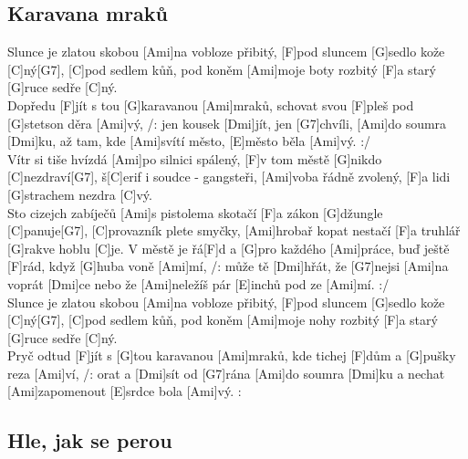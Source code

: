 \documentclass[10pt]{article}
\begin{document}
\begin{Large}
\begin{minipage}{\textwidth}
\subsection{Karavana mraků}
\begin{multicols}{2}
\begin{guitar}
	[C]Slunce je zlatou skobou [Ami]na vobloze přibitý,
	[F]pod sluncem [G]sedlo kože [C]ný[G7],
	[C]pod sedlem kůň, 
	pod koněm [Ami]moje boty rozbitý
	[F]a starý [G]ruce sedře [C]ný.
	\\
	[C7]Dopředu [F]jít s tou [G]karavanou [Ami]mraků,
	schovat svou [F]pleš pod [G]stetson děra [Ami]vý,
	/: jen kousek [Dmi]jít, jen [G7]chvíli, [Ami]do soumra [Dmi]ku,
	až tam, kde [Ami]svítí město, [E]město běla [Ami]vý. :/
	\\
	[C]Vítr si tiše hvízdá [Ami]po silnici spálený,
	[F]v tom městě [G]nikdo [C]nezdraví[G7], 
	š[C]erif i soudce - gangsteři, 
	[Ami]voba řádně zvolený,
	[F]a lidi [G]strachem nezdra [C]vý.
	\\
	[C]Sto cizejch zabíječů [Ami]s pistolema skotačí
	[F]a zákon [G]džungle [C]panuje[G7], 
	[C]provazník plete smyčky, 
	[Ami]hrobař kopat nestačí
	[F]a truhlář [G]rakve hoblu [C]je.
	\columnbreak
	[C7]V městě je řá[F]d a [G]pro každého [Ami]práce,
	buď ještě [F]rád, když [G]huba voně [Ami]mí,
	/: může tě [Dmi]hřát, že [G7]nejsi [Ami]na voprát [Dmi]ce
	nebo že [Ami]neležíš pár [E]inchů pod ze [Ami]mí. :/
	\\
	[C]Slunce je zlatou skobou [Ami]na vobloze přibitý,
	[F]pod sluncem [G]sedlo kože [C]ný[G7], 
	[C]pod sedlem kůň, 
	pod koněm [Ami]moje nohy rozbitý
	[F]a starý [G]ruce sedře [C]ný.
	\\
	[C7]Pryč odtud [F]jít s [G]tou karavanou [Ami]mraků,
	kde tichej [F]dům a [G]pušky reza [Ami]ví,
	/: orat a [Dmi]sít od [G7]rána [Ami]do soumra [Dmi]ku
	a nechat [Ami]zapomenout [E]srdce bola [Ami]vý. :	
\end{guitar}
\end{multicols}
\end{minipage}

\begin{minipage}{\textwidth}
\subsection{Hle, jak se perou}
\begin{multicols}{2}
\begin{guitar}
	

\end{guitar}
\end{multicols}
\end{minipage}
\end{Large}
\end{document}
